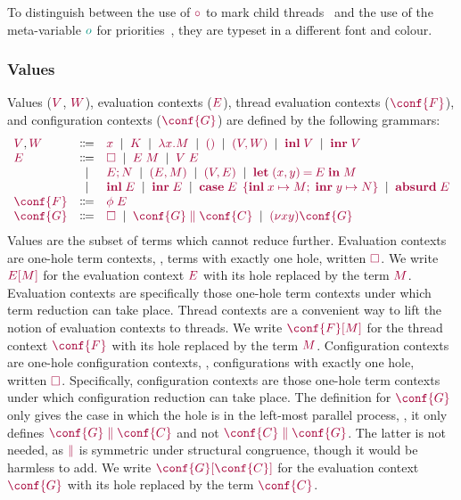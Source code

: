 To distinguish between the use of $\tm{\child}$ to mark child threads~\cite{lindleymorris15} and the use of the meta-variable $\cs{o}$ for priorities~\cite{dardhagay18extended}, they are typeset in a different font and colour.

\subsubsection*{Values}
Values ($\tm{V}$, $\tm{W}$), evaluation contexts ($\tm{E}$), thread evaluation contexts ($\tm{\conf{F}}$), and configuration contexts ($\tm{\conf{G}}$) are defined by the following grammars:
\[
  \begin{array}[t]{lcl}
    \tm{V}, \tm{W}
     & \Coloneqq & \tm{x}
    \sep        \tm{K}
    \sep        \tm{\lambda x.M}
    \sep        \tm{\unit}
    \sep        \tm{\pair{V}{W}}
    \sep        \tm{\inl{V}}
    \sep        \tm{\inr{V}}              \\
    \tm{E}
     & \Coloneqq & \tm{\hole}
    \sep        \tm{E\;M}
    \sep        \tm{V\;E}                 \\
     & \sep      & \tm{\andthen{E}{N}}
    \sep        \tm{\pair{E}{M}}
    \sep        \tm{\pair{V}{E}}
    \sep        \tm{\letpair{x}{y}{E}{M}} \\
     & \sep      & \tm{\inl{E}}
    \sep        \tm{\inr{E}}
    \sep        \tm{\casesum{E}{x}{M}{y}{N}}
    \sep        \tm{\absurd{E}}           \\
    \tm{\conf{F}}
     & \Coloneqq & \tm{\phi\;E}
    \\
    \tm{\conf{G}}
     & \Coloneqq & \tm{\hole}
    \sep        \tm{\ppar{\conf{G}}{\conf{C}}}
    \sep        \tm{\res{x}{y}{\conf{G}}}
  \end{array}
\]
Values are the subset of terms which cannot reduce further.
Evaluation contexts are one-hole term contexts, \ie, terms with exactly one hole, written $\tm{\hole}$. We write $\tm{\plug{E}{M}}$ for the evaluation context $\tm{E}$ with its hole replaced by the term $\tm{M}$. Evaluation contexts are specifically those one-hole term contexts under which term reduction can take place.
Thread contexts are a convenient way to lift the notion of evaluation contexts to threads. We write $\tm{\plug{\conf{F}}{M}}$ for the thread context $\tm{\conf{F}}$ with its hole replaced by the term $\tm{M}$.
Configuration contexts are one-hole configuration contexts, \ie, configurations with exactly one hole, written $\tm{\hole}$. Specifically, configuration contexts are those one-hole term contexts under which configuration reduction can take place. The definition for $\tm{\conf{G}}$ only gives the case in which the hole is in the left-most parallel process, \ie, it only defines $\tm{\ppar{\conf{G}}{\conf{C}}}$ and not $\tm{\ppar{\conf{C}}{\conf{G}}}$. The latter is not needed, as $\tm{\parallel}$ is symmetric under structural congruence, though it would be harmless to add. We write $\tm{\plug{\conf{G}}{\conf{C}}}$ for the evaluation context $\tm{\conf{G}}$ with its hole replaced by the term $\tm{\conf{C}}$.


